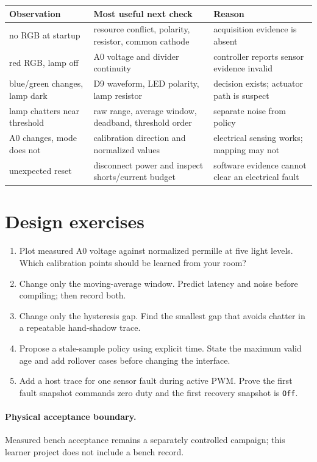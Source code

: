 \documentclass[11pt]{article}
\begin{document}
\begin{tabularx}{\linewidth}{@{}l X X@{}}
\toprule
Observation & Most useful next check & Reason\\
\midrule
no RGB at startup & resource conflict, polarity, resistor, common cathode & acquisition evidence is absent\\
red RGB, lamp off & A0 voltage and divider continuity & controller reports sensor evidence invalid\\
blue/green changes, lamp dark & D9 waveform, LED polarity, lamp resistor & decision exists; actuator path is suspect\\
lamp chatters near threshold & raw range, average window, deadband, threshold order & separate noise from policy\\
A0 changes, mode does not & calibration direction and normalized values & electrical sensing works; mapping may not\\
unexpected reset & disconnect power and inspect shorts/current budget & software evidence cannot clear an electrical fault\\
\bottomrule
\end{tabularx}

\section{Design exercises}

\begin{enumerate}
  \item Plot measured A0 voltage against normalized permille at five light
        levels. Which calibration points should be learned from your room?
  \item Change only the moving-average window. Predict latency and noise before
        compiling; then record both.
  \item Change only the hysteresis gap. Find the smallest gap that avoids
        chatter in a repeatable hand-shadow trace.
  \item Propose a stale-sample policy using explicit time. State the maximum
        valid age and add rollover cases before changing the interface.
  \item Add a host trace for one sensor fault during active PWM. Prove the first
        fault snapshot commands zero duty and the first recovery snapshot is
        \texttt{Off}.
\end{enumerate}

\paragraph{Physical acceptance boundary.}
Measured bench acceptance remains a separately controlled campaign; this
learner project does not include a bench record.
\end{document}
